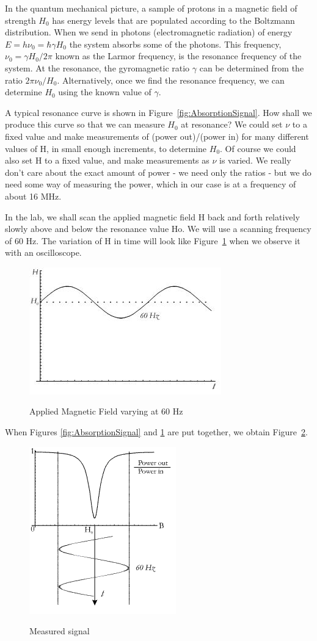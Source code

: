 \documentclass{../lab}
\begin{document}
In the quantum mechanical picture, a sample of protons in a magnetic field of strength $H_0$ has energy levels that are populated according to the Boltzmann distribution. When we send in photons (electromagnetic radiation) of energy $E = h\nu_0 = \hbar \gamma H_0$ the system absorbs some of the photons. This frequency, $\nu_0 = \gamma H_0 / 2\pi$ known as the Larmor frequency, is the resonance frequency of the system. At the resonance, the gyromagnetic ratio $\gamma $ can be determined from the ratio $2 \pi \nu_0 / H_0$. Alternatively, once we find the resonance frequency, we can determine $H_0$ using the known value of $\gamma$.

A typical resonance curve is shown in Figure~\ref{fig:AbsorptionSignal}. How shall we produce this curve so that we can measure $H_0$ at resonance? We could set $\nu$ to a fixed value and make measurements of (power out)/(power in) for many different values of H, in small enough increments, to determine $H_0$. Of course we could also set H to a fixed value, and make measurements as $\nu$ is varied. We really don't care about the exact amount of power - we need only the ratios - but we do need some way of measuring the power, which in our case is at a frequency of about 16 MHz.

In the lab, we shall scan the applied magnetic field H back and forth relatively slowly above and below the resonance value Ho. We will use a scanning frequency of 60 Hz. The variation of H in time will look like Figure~\ref{fig:AppliedMagneticField} when we observe it with an oscilloscope.

\begin{figure}[h]
    \centering
    \href{http://experimentationlab.berkeley.edu/sites/default/files/images/NMR5.jpg}{\includegraphics[width=0.3\linewidth]{images/NMR5.jpg}}
    \caption{Applied Magnetic Field varying at 60 Hz}
    \label{fig:AppliedMagneticField}
\end{figure}

When Figures \ref{fig:AbsorptionSignal} and \ref{fig:AppliedMagneticField} are put together, we obtain Figure~\ref{fig:MeasuredSignal}.

\begin{figure}[h]
    \centering
    \href{http://experimentationlab.berkeley.edu/sites/default/files/images/NMR6.gif}{\includegraphics[width=0.3\linewidth]{images/NMR6.png}}
    \caption{Measured signal}
    \label{fig:MeasuredSignal}
\end{figure}
\end{document}
